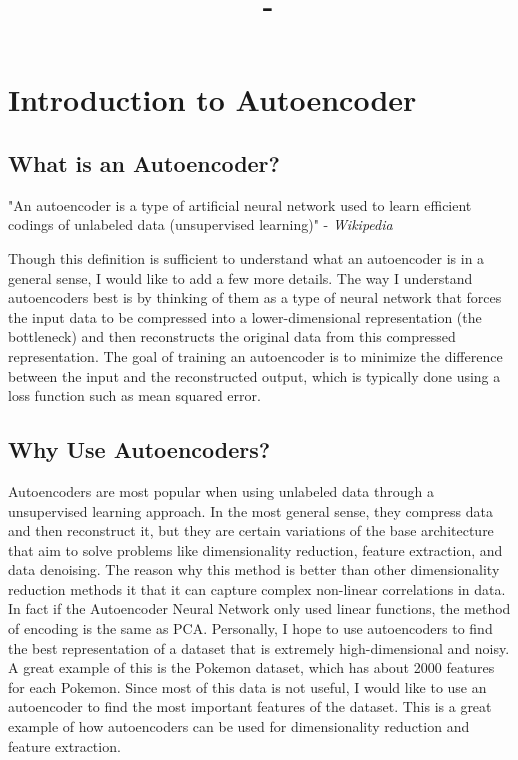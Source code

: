\documentclass[answers,12pt,addpoints]{exam}
\author{\name}
\title{\course \ - \assignment}
\begin{document}
\maketitle
\tableofcontents
\newpage

\section{Introduction to Autoencoder}
\subsection{What is an Autoencoder?}
\begin{definition}[Autoencoder]
    "An autoencoder is a type of artificial neural network used to learn efficient codings of unlabeled data (unsupervised learning)" - \textit{Wikipedia}
\end{definition}
Though this definition is sufficient to understand what an autoencoder is in a general sense, I would like to add a few more details. The way I understand autoencoders best is by thinking of them as a type of neural network that forces the input data to be compressed into a lower-dimensional representation (the bottleneck) and then reconstructs the original data from this compressed representation. The goal of training an autoencoder is to minimize the difference between the input and the reconstructed output, which is typically done using a loss function such as mean squared error.
\subsection{Why Use Autoencoders?}
Autoencoders are most popular when using unlabeled data through a unsupervised learning approach. In the most general sense, they compress data and then reconstruct it, but they are certain variations of the base architecture that aim to solve problems like dimensionality reduction, feature extraction, and data denoising. The reason why this method is better than other dimensionality reduction methods it that it can capture complex non-linear correlations in data. In fact if the Autoencoder Neural Network only used linear functions, the method of encoding is the same as PCA. Personally, I hope to use autoencoders to find the best representation of a dataset that is extremely high-dimensional and noisy. A great example of this is the Pokemon dataset, which has about 2000 features for each Pokemon. Since most of this data is not useful, I would like to use an autoencoder to find the most important features of the dataset. This is a great example of how autoencoders can be used for dimensionality reduction and feature extraction.
\end{document}
